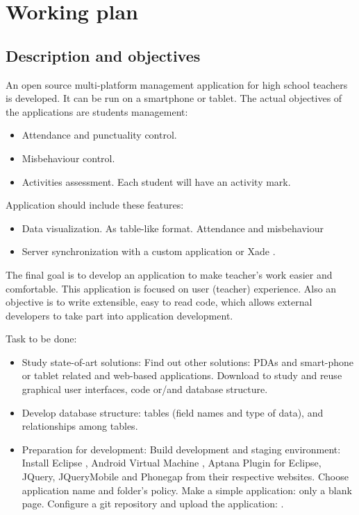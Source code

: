 \chapter{Working plan}
\section{Description and objectives}

	An open source multi-platform management application for high school teachers is developed. It can be run on a smartphone or tablet. 
	The actual objectives of the applications are students management:
	\begin{itemize}
	  \item Attendance and punctuality control. 
	  \item Misbehaviour control.
	  \item Activities assessment. Each student will have an activity mark.
	\end{itemize}

	Application should include these features:
	\begin{itemize}
	  \item Data visualization. As table-like format. Attendance and misbehaviour
	  \item Server synchronization with a custom application or Xade \cite{Xade}.
	\end{itemize}

	The final goal is to develop an application to make teacher's work easier and comfortable. This application is focused on user  (teacher) experience.
	Also an objective is to write extensible, easy to read code, which allows external developers to take part into application development.
	
	Task to be done:
	\begin{itemize}
	  \item Study state-of-art solutions: 
  \subitem  Find out other solutions: PDAs and smart-phone or tablet related and web-based applications.
  \subitem  Download to study and reuse graphical user interfaces, code or/and database structure. 
  \item   Develop database structure: tables (field names and type of data), and relationships among tables. 
  \item   Preparation for development:
\subitem  Build development and staging environment: 
\subsubitem Install Eclipse \cite{Eclipse}, Android Virtual Machine \cite{AndroidDevelopmentKit}, Aptana Plugin for Eclipse, JQuery, JQueryMobile \cite{JQueryMobile} and Phonegap \cite{PhoneGap} from their respective websites.
\subitem   Choose application name and folder's policy.
\subitem   Make a simple application: only a blank page.
\subitem  Configure a git repository and upload the application: \cite{EduXes}.
	\end{itemize}
	
